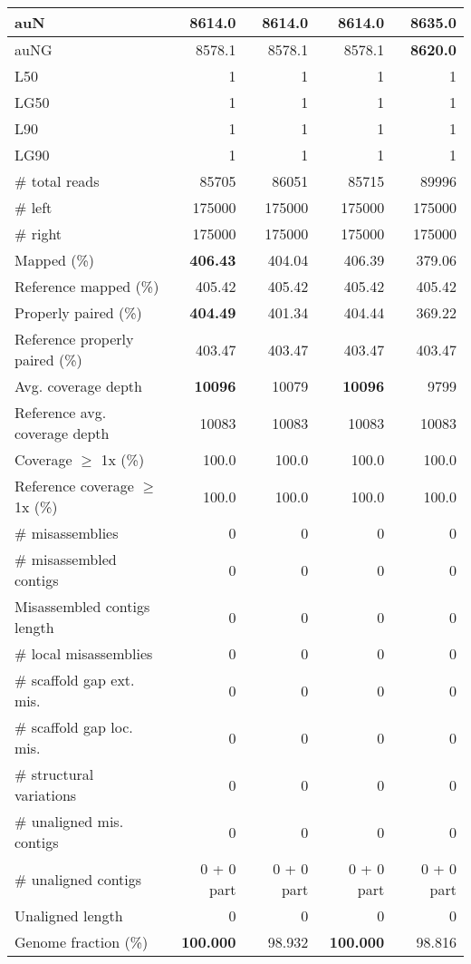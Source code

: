 \documentclass[12pt,a4paper]{article}
\begin{document}
\begin{table}[ht]
\begin{center}
\begin{tabular}{|l*{4}{|r}|}
auN & 8614.0 & 8614.0 & 8614.0 & {\bf 8635.0} \\ \hline
auNG & 8578.1 & 8578.1 & 8578.1 & {\bf 8620.0} \\ \hline
L50 & 1 & 1 & 1 & 1 \\ \hline
LG50 & 1 & 1 & 1 & 1 \\ \hline
L90 & 1 & 1 & 1 & 1 \\ \hline
LG90 & 1 & 1 & 1 & 1 \\ \hline
\# total reads & 85705 & 86051 & 85715 & 89996 \\ \hline
\# left & 175000 & 175000 & 175000 & 175000 \\ \hline
\# right & 175000 & 175000 & 175000 & 175000 \\ \hline
Mapped (\%) & {\bf 406.43} & 404.04 & 406.39 & 379.06 \\ \hline
Reference mapped (\%) & 405.42 & 405.42 & 405.42 & 405.42 \\ \hline
Properly paired (\%) & {\bf 404.49} & 401.34 & 404.44 & 369.22 \\ \hline
Reference properly paired (\%) & 403.47 & 403.47 & 403.47 & 403.47 \\ \hline
Avg. coverage depth & {\bf 10096} & 10079 & {\bf 10096} & 9799 \\ \hline
Reference avg. coverage depth & 10083 & 10083 & 10083 & 10083 \\ \hline
Coverage $\geq$ 1x (\%) & 100.0 & 100.0 & 100.0 & 100.0 \\ \hline
Reference coverage $\geq$ 1x (\%) & 100.0 & 100.0 & 100.0 & 100.0 \\ \hline
\# misassemblies & 0 & 0 & 0 & 0 \\ \hline
\# misassembled contigs & 0 & 0 & 0 & 0 \\ \hline
Misassembled contigs length & 0 & 0 & 0 & 0 \\ \hline
\# local misassemblies & 0 & 0 & 0 & 0 \\ \hline
\# scaffold gap ext. mis. & 0 & 0 & 0 & 0 \\ \hline
\# scaffold gap loc. mis. & 0 & 0 & 0 & 0 \\ \hline
\# structural variations & 0 & 0 & 0 & 0 \\ \hline
\# unaligned mis. contigs & 0 & 0 & 0 & 0 \\ \hline
\# unaligned contigs & 0 + 0 part & 0 + 0 part & 0 + 0 part & 0 + 0 part \\ \hline
Unaligned length & 0 & 0 & 0 & 0 \\ \hline
Genome fraction (\%) & {\bf 100.000} & 98.932 & {\bf 100.000} & 98.816 \\ \hline

\end{tabular}
\end{center}
\end{table}
\end{document}
